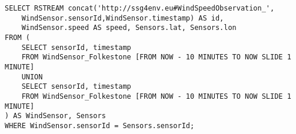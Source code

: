 \begin{lstlisting}[style=SNEEqlStyle,language=SNEEql,frame=none,float,label=list:query-ex-sneeql,caption=The \sneeql query that is generated for the input query in Listing~\ref{list:query-example}.]
SELECT RSTREAM concat('http://ssg4env.eu#WindSpeedObservation_',
	WindSensor.sensorId,WindSensor.timestamp) AS id, 
	WindSensor.speed AS speed, Sensors.lat, Sensors.lon
FROM (
	SELECT sensorId, timestamp 
	FROM WindSensor_Folkestone [FROM NOW - 10 MINUTES TO NOW SLIDE 1 MINUTE] 
	UNION 
	SELECT sensorId, timestamp 
	FROM WindSensor_Folkestone [FROM NOW - 10 MINUTES TO NOW SLIDE 1 MINUTE] 
) AS WindSensor, Sensors 
WHERE WindSensor.sensorId = Sensors.sensorId; 
\end{lstlisting}







